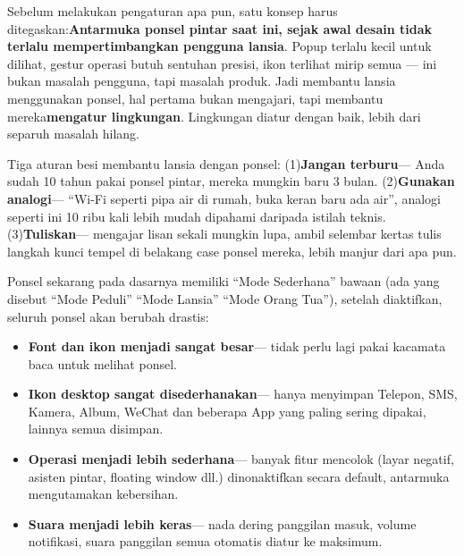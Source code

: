 


Sebelum melakukan pengaturan apa pun, satu konsep harus ditegaskan:\textbf{Antarmuka ponsel pintar saat ini, sejak awal desain tidak terlalu mempertimbangkan pengguna lansia}. Popup terlalu kecil untuk dilihat, gestur operasi butuh sentuhan presisi, ikon terlihat mirip semua — ini bukan masalah pengguna, tapi masalah produk. Jadi membantu lansia menggunakan ponsel, hal pertama bukan mengajari, tapi membantu mereka\textbf{mengatur lingkungan}. Lingkungan diatur dengan baik, lebih dari separuh masalah hilang.

Tiga aturan besi membantu lansia dengan ponsel: (1)\textbf{Jangan terburu}— Anda sudah 10 tahun pakai ponsel pintar, mereka mungkin baru 3 bulan. (2)\textbf{Gunakan analogi}— “Wi-Fi seperti pipa air di rumah, buka keran baru ada air”, analogi seperti ini 10 ribu kali lebih mudah dipahami daripada istilah teknis. (3)\textbf{Tuliskan}— mengajar lisan sekali mungkin lupa, ambil selembar kertas tulis langkah kunci tempel di belakang case ponsel mereka, lebih manjur dari apa pun.


Ponsel sekarang pada dasarnya memiliki “Mode Sederhana” bawaan (ada yang disebut “Mode Peduli” “Mode Lansia” “Mode Orang Tua”), setelah diaktifkan, seluruh ponsel akan berubah drastis:

\begin{itemize}
  \item \textbf{Font dan ikon menjadi sangat besar}— tidak perlu lagi pakai kacamata baca untuk melihat ponsel.
  \item \textbf{Ikon desktop sangat disederhanakan}— hanya menyimpan Telepon, SMS, Kamera, Album, WeChat dan beberapa App yang paling sering dipakai, lainnya semua disimpan.
  \item \textbf{Operasi menjadi lebih sederhana}— banyak fitur mencolok (layar negatif, asisten pintar, floating window dll.) dinonaktifkan secara default, antarmuka mengutamakan kebersihan.
  \item \textbf{Suara menjadi lebih keras}— nada dering panggilan masuk, volume notifikasi, suara panggilan semua otomatis diatur ke maksimum.
\end{itemize}

